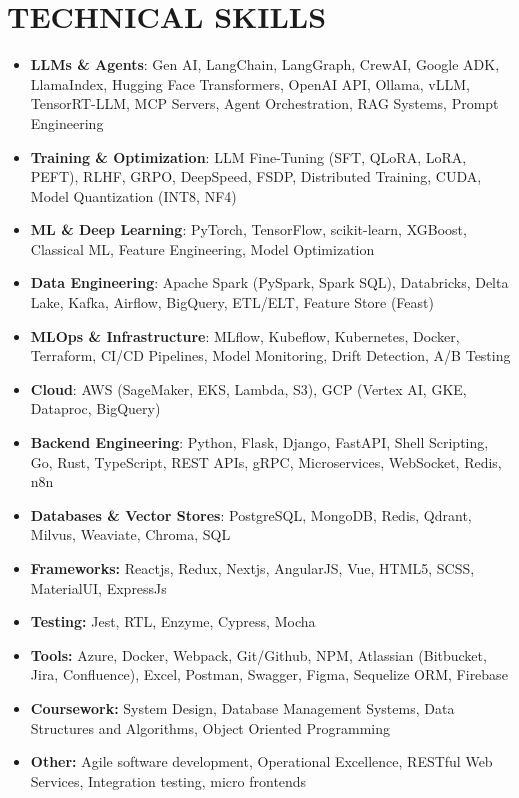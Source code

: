 \documentclass[100pt,a4paper]{article}
\begin{document}
\section*{TECHNICAL SKILLS}
\setlength{\arrayrulewidth}{1.2pt}
\begin{itemize}
\item \textbf{LLMs \& Agents}{: Gen AI, LangChain, LangGraph, CrewAI, Google ADK, LlamaIndex, Hugging Face Transformers, OpenAI API, Ollama, vLLM, TensorRT-LLM, MCP Servers, Agent Orchestration, RAG Systems, Prompt Engineering}
\item \textbf{Training \& Optimization}{: LLM Fine-Tuning (SFT, QLoRA, LoRA, PEFT), RLHF, GRPO, DeepSpeed, FSDP, Distributed Training, CUDA, Model Quantization (INT8, NF4)}
\item \textbf{ML \& Deep Learning}{: PyTorch, TensorFlow, scikit-learn, XGBoost, Classical ML, Feature Engineering, Model Optimization}
\item \textbf{Data Engineering}{: Apache Spark (PySpark, Spark SQL), Databricks, Delta Lake, Kafka, Airflow, BigQuery, ETL/ELT, Feature Store (Feast)}
\item \textbf{MLOps \& Infrastructure}{: MLflow, Kubeflow, Kubernetes, Docker, Terraform, CI/CD Pipelines, Model Monitoring, Drift Detection, A/B Testing}
\item \textbf{Cloud}{: AWS (SageMaker, EKS, Lambda, S3), GCP (Vertex AI, GKE, Dataproc, BigQuery)}
\item \textbf{Backend Engineering}{: Python, Flask, Django, FastAPI, Shell Scripting, Go, Rust, TypeScript, REST APIs, gRPC, Microservices, WebSocket, Redis, n8n}
\item \textbf{Databases \& Vector Stores}{: PostgreSQL, MongoDB, Redis, Qdrant, Milvus, Weaviate, Chroma, SQL}
\item \textbf{Frameworks:} Reactjs, Redux, Nextjs, AngularJS, Vue, HTML5, SCSS, MaterialUI, ExpressJs
\item \textbf{Testing:} Jest, RTL, Enzyme, Cypress, Mocha
\item \textbf{Tools:} Azure, Docker, Webpack, Git/Github, NPM, Atlassian (Bitbucket, Jira, Confluence), Excel, Postman, Swagger, Figma, Sequelize ORM, Firebase
\item \textbf{Coursework:} System Design, Database Management Systems, Data Structures and Algorithms, Object Oriented Programming
\item \textbf{Other:} Agile software development, Operational Excellence, RESTful Web Services, Integration testing, micro frontends
\end{itemize}
\end{document}
